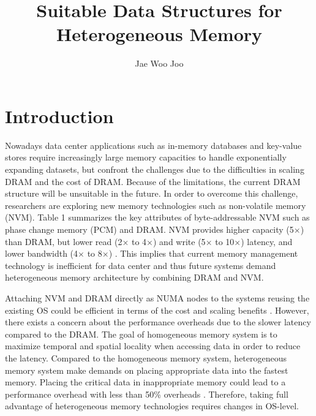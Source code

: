 \documentclass{sig-alternate}
\title{Suitable Data Structures for Heterogeneous Memory}
\author{Jae Woo Joo}
\begin{document}
\maketitle
\pagestyle{plain}




\section{Introduction}

Nowadays data center applications such as in-memory databases \cite{stonebraker2013voltdb} and key-value stores \cite{Redis, Memcached} require increasingly large memory capacities to handle exponentially expanding datasets, but confront the challenges due to the difficulties in scaling DRAM and the cost of DRAM. Because of the limitations, the current DRAM structure will be unsuitable in the future. In order to overcome this challenge, researchers are exploring new memory technologies such as non-volatile memory (NVM). Table 1 summarizes the key attributes of byte-addressable NVM such as phase change memory (PCM) and DRAM. NVM provides higher capacity (5$\times$) than DRAM, but lower read (2$\times$ to 4$\times$) and write (5$\times$ to 10$\times$) latency, and lower bandwidth (4$\times$ to 8$\times$) \cite{venkataraman2011consistent, dulloor2016data, kannan2017heteroos}. This implies that current memory management technology is inefficient for data center and thus future systems demand heterogeneous memory architecture by combining DRAM and NVM.

Attaching NVM and DRAM directly as NUMA nodes to the systems reusing the existing OS could be efficient in terms of the cost and scaling benefits \cite{dulloor2016data}. However, there exists a concern about the performance overheads due to the slower latency compared to the DRAM. The goal of homogeneous memory system is to maximize temporal and spatial locality when accessing data in order to reduce the latency. Compared to the homogeneous memory system, heterogeneous memory system make demands on placing appropriate data into the fastest memory. Placing the critical data in inappropriate memory could lead to a performance overhead with less than 50\% overheads \cite{kannan2017heteroos}. Therefore, taking full advantage of heterogeneous memory technologies requires changes in OS-level. 
\end{document}
